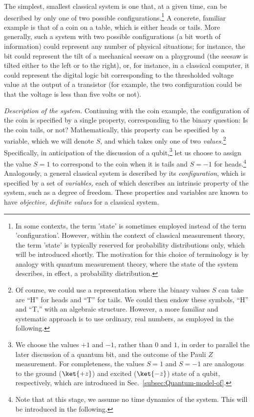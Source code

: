 The simplest, smallest classical system is one that, at a given time,
can be described by only one of two possible configurations.\footnote{In some contexts, the term 'state' is sometimes employed instead of
the term 'configuration'. However, within the context of classical
measurement theory, the term 'state' is typically reserved for probability
distributions only, which will be introduced shortly. The motivation
for this choice of terminology is by analogy with quantum measurement
theory, where the state of the system describes, in effect, a probability
distribution.} A concrete, familiar example is that of a coin on a table, which
is either heads or tails. More generally, such a system with two possible
configurations (a bit worth of information) could represent any number
of physical situations; for instance, the bit could represent the
tilt of a mechanical seesaw on a playground (the seesaw is tilted
either to the left or to the right), or, for instance, in a classical
computer, it could represent the digital logic bit corresponding to
the thresholded voltage value at the output of a transistor (for example,
the two configuration could be that the voltage is less than five
volts or not).

\emph{Description of the system.} Continuing with the coin example,
the configuration of the coin is specified by a single property, corresponding
to the binary question: Is the coin tails, or not? Mathematically,
this property can be specified by a variable, which we will denote
$S$, and which takes only one of two \emph{values.}\footnote{Of course, we could use a representation where the binary values $S$
can take are ``H'' for heads and ``T'' for tails. We could then
endow these symbols, ``H'' and ``T,'' with an algebraic structure.
However, a more familiar and systematic approach is to use ordinary,
real numbers, as employed in the following.}\emph{ }Specifically, in anticipation of the discussion of a qubit,\footnote{We choose the values $+1$ and $-1$, rather than $0$ and $1$, in
order to parallel the later discussion of a quantum bit, and the outcome
of the Pauli $Z$ measurement. For completeness, the values $S=1$
and $S=-1$ are analogous to the ground ($\ket{+z}$) and excited
($\ket{-z}$) state of a qubit, respectively, which are introduced
in Sec.~\ref{subsec:Quantum-model-of}.} let us choose to assign the value $S=1$  to correspond to the coin
when it is tails and $S=-1$  for heads.\footnote{Note that at this stage, we assume no time dynamics of the system.
This will be introduced in the following.} Analogously, a general classical system is described by its \emph{configuration},
which is specified by a set of\emph{ variables, }each of which describes
an intrinsic property of the system, such as a degree of freedom.
These properties and variables are known to have \emph{objective,
definite values} for a classical system.

